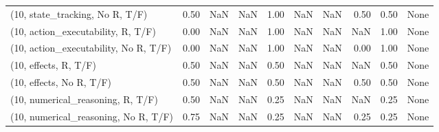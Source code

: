 \begin{table*}[h!]
\begin{adjustbox}{width=2\columnwidth,center}
\begin{tabular}{lrrr|rrr|rrr}
(10, state\_tracking, No R, T/F)       &                      0.50 &                   NaN &                       NaN &                          1.00 &                       NaN &                           NaN &                                   0.50 &                               0.50 &                                  None \\
(10, action\_executability, R, T/F)    &                      0.00 &                   NaN &                       NaN &                          1.00 &                       NaN &                           NaN &                                    NaN &                               1.00 &                                  None \\
(10, action\_executability, No R, T/F) &                      0.00 &                   NaN &                       NaN &                          1.00 &                       NaN &                           NaN &                                   0.00 &                               1.00 &                                  None \\
(10, effects, R, T/F)                 &                      0.50 &                   NaN &                       NaN &                          0.50 &                       NaN &                           NaN &                                    NaN &                               0.50 &                                  None \\
(10, effects, No R, T/F)              &                      0.50 &                   NaN &                       NaN &                          0.50 &                       NaN &                           NaN &                                   0.50 &                               0.50 &                                  None \\
(10, numerical\_reasoning, R, T/F)     &                      0.50 &                   NaN &                       NaN &                          0.25 &                       NaN &                           NaN &                                    NaN &                               0.25 &                                  None \\
(10, numerical\_reasoning, No R, T/F)  &                      0.75 &                   NaN &                       NaN &                          0.25 &                       NaN &                           NaN &                                   0.25 &                               0.25 &                                  None \\

\end{tabular}
\end{adjustbox}
\end{table*}

